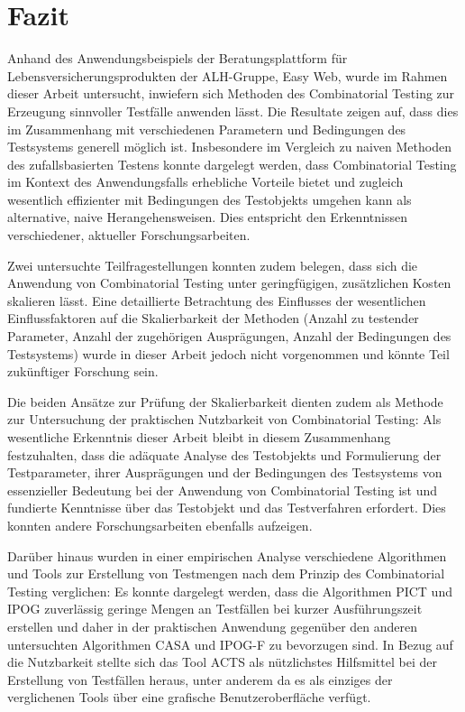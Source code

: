 \chapter{Fazit}

Anhand des Anwendungsbeispiels der Beratungsplattform für Lebensversicherungsprodukten der ALH-Gruppe, Easy Web, wurde im Rahmen dieser Arbeit untersucht, inwiefern sich Methoden des Combinatorial Testing zur Erzeugung sinnvoller Testfälle anwenden lässt. Die Resultate zeigen auf, dass dies im Zusammenhang mit verschiedenen Parametern und Bedingungen des Testsystems generell möglich ist. Insbesondere im Vergleich zu naiven Methoden des zufallsbasierten Testens konnte dargelegt werden, dass Combinatorial Testing im Kontext des Anwendungsfalls erhebliche Vorteile bietet und zugleich wesentlich effizienter mit Bedingungen des Testobjekts umgehen kann als alternative, naive Herangehensweisen. Dies entspricht den Erkenntnissen verschiedener, aktueller Forschungsarbeiten.

Zwei untersuchte Teilfragestellungen konnten zudem belegen, dass sich die Anwendung von Combinatorial Testing unter geringfügigen, zusätzlichen Kosten skalieren lässt. Eine detaillierte Betrachtung des Einflusses der wesentlichen Einflussfaktoren auf die Skalierbarkeit der Methoden (Anzahl zu testender Parameter, Anzahl der zugehörigen Ausprägungen, Anzahl der Bedingungen des Testsystems) wurde in dieser Arbeit jedoch nicht vorgenommen und könnte Teil zukünftiger Forschung sein.

Die beiden Ansätze zur Prüfung der Skalierbarkeit dienten zudem als Methode zur Untersuchung der praktischen Nutzbarkeit von Combinatorial Testing: Als wesentliche Erkenntnis dieser Arbeit bleibt in diesem Zusammenhang festzuhalten, dass die adäquate Analyse des Testobjekts und Formulierung der Testparameter, ihrer Ausprägungen und der Bedingungen des Testsystems von essenzieller Bedeutung bei der Anwendung von Combinatorial Testing ist und fundierte Kenntnisse über das Testobjekt und das Testverfahren erfordert. Dies konnten andere Forschungsarbeiten ebenfalls aufzeigen.

Darüber hinaus wurden in einer empirischen Analyse verschiedene Algorithmen und Tools zur Erstellung von Testmengen nach dem Prinzip des Combinatorial Testing verglichen: Es konnte dargelegt werden, dass die Algorithmen PICT und IPOG zuverlässig geringe Mengen an Testfällen bei kurzer Ausführungszeit erstellen und daher in der praktischen Anwendung gegenüber den anderen untersuchten Algorithmen CASA und IPOG-F zu bevorzugen sind. In Bezug auf die Nutzbarkeit stellte sich das Tool ACTS als nützlichstes Hilfsmittel bei der Erstellung von Testfällen heraus, unter anderem da es als einziges der verglichenen Tools über eine grafische Benutzeroberfläche verfügt.




